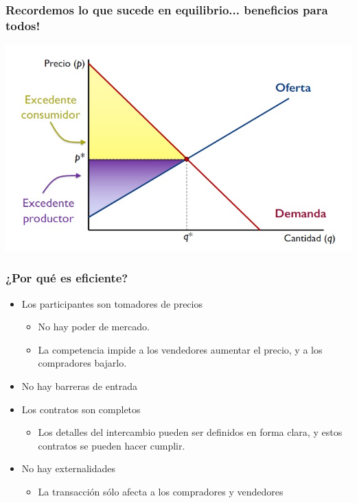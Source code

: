 \documentclass{beamer}
\begin{document}
\begin{frame}
    \frametitle{Recordemos lo que sucede en equilibrio... beneficios para todos!}
    \begin{center}
    \includegraphics[scale=0.55]{../Figures/Tema_07.23_equilibrioyexcedente.jpg}
    \end{center}
    \end{frame}
    
    \begin{frame}
    \frametitle{¿Por qué es eficiente?}
    \begin{itemize}
        \item Los participantes son tomadores de precios
        \begin{itemize}
            \item No hay poder de mercado.
            \item La competencia impide a los vendedores aumentar el precio, y a los compradores bajarlo.
        \end{itemize}
        \item No hay barreras de entrada
        \item Los contratos son completos
            \begin{itemize}
            \item Los detalles del intercambio pueden ser definidos en forma clara, y estos contratos se pueden hacer cumplir.
            \end{itemize}
        \item No hay externalidades
            \begin{itemize}
            \item La transacción sólo afecta a los compradores y vendedores
            \end{itemize}
    \end{itemize}
\end{frame}
\end{document}
